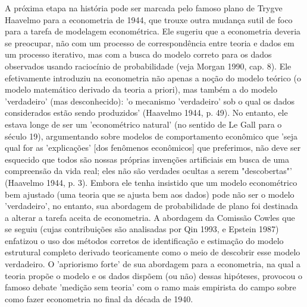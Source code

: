 \documentclass[12pt]{article}
\begin{document}
A próxima etapa na história pode ser marcada pelo famoso plano de Trygve Haavelmo para a econometria de 1944, que trouxe outra mudança sutil de foco para a tarefa de modelagem econométrica. Ele sugeriu que a econometria deveria se preocupar, não com um processo de correspondência entre teoria e dados em um processo iterativo, mas com a busca do modelo correto para os dados observados usando raciocínio de probabilidade (veja Morgan 1990, cap. 8). Ele efetivamente introduziu na econometria não apenas a noção do modelo teórico (o modelo matemático derivado da teoria a priori), mas também a do modelo 'verdadeiro' (mas desconhecido): 'o mecanismo 'verdadeiro' sob o qual os dados considerados estão sendo produzidos' (Haavelmo 1944, p. 49). No entanto, ele estava longe de ser um 'econométrico natural' (no sentido de Le Gall para o século 19), argumentando sobre modelos de comportamento econômico que 'seja qual for as 'explicações' [dos fenômenos econômicos] que preferimos, não deve ser esquecido que todos são nossas próprias invenções artificiais em busca de uma compreensão da vida real; eles não são verdades ocultas a serem "descobertas"' (Haavelmo 1944, p. 3). Embora ele tenha insistido que um modelo econométrico bem ajustado (uma teoria que se ajusta bem aos dados) pode não ser o modelo 'verdadeiro', no entanto, sua abordagem de probabilidade de plano foi destinada a alterar a tarefa aceita de econometria. A abordagem da Comissão Cowles que se seguiu (cujas contribuições são analisadas por Qin 1993, e Epstein 1987) enfatizou o uso dos métodos corretos de identificação e estimação do modelo estrutural completo derivado teoricamente como o meio de descobrir esse modelo verdadeiro. O 'apriorismo forte' de sua abordagem para a econometria, na qual a teoria propõe o modelo e os dados dispõem (ou não) dessas hipóteses, provocou o famoso debate 'medição sem teoria' com o ramo mais empirista do campo sobre como fazer econometria no final da década de 1940.
\end{document}
